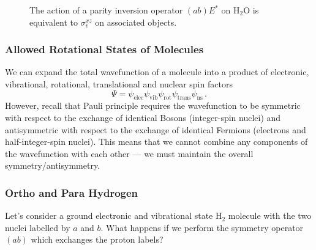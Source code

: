 \documentclass{article}
\theoremstyle{plain}\theoremheaderfont{\normalfont\itshape}\theorembodyfont{\rmfamily}\theoremseparator{.}\newtheorem*{rem}{Remark}\newtheorem*{ex}{Example}\newtheorem*{proof}{Proof}\newtheorem*{altp}{Alternative proof}
\theoremstyle{plain}\theoremheaderfont{\normalfont\bfseries}\theorembodyfont{\rmfamily}\theoremseparator{.}\newtheorem{thm}{Theorem}[section]\newtheorem{lem}[thm]{Lemma}\newtheorem{prop}[thm]{Proposition}\newtheorem*{cor}{Corollary}\newtheorem{defn}[thm]{Definition}\newtheorem{clm}[thm]{Claim}\newtheorem{clminproof}{Claim}\newtheorem*{law}{Law}\newtheorem{pos}[thm]{Postulate}
\theoremstyle{break}\theoremheaderfont{\normalfont\itshape}\theorembodyfont{\rmfamily}\theoremseparator{.\medskip}\newtheorem*{proofskip}{Proof}\newtheorem*{exs}{Examples}\newtheorem*{rems}{Remarks}
\theoremstyle{break}\theoremheaderfont{\normalfont\bfseries}\theorembodyfont{\rmfamily}\theoremseparator{.\medskip}\newtheorem{lemskip}[thm]{Lemma}\newtheorem{defnskip}[thm]{Definition}\newtheorem{propskip}[thm]{Proposition}\newtheorem{thmskip}[thm]{Theorem}
\numberwithin{equation}{section}
\begin{document}
\begin{figure}[ht!]
        \caption{The action of a parity inversion operator \((ab)E^*\) on \(\mathrm{H_2O}\) is equivalent to \(\sigma_v^{xz}\) on associated objects.}
        \label{inversion_permutation}
    \end{figure}

    \subsubsection{Allowed Rotational States of Molecules}
    We can expand the total wavefunction of a molecule into a product of electronic, vibrational, rotational, translational and nuclear spin factors
    \begin{equation}
        \Psi=\psi_{\text{elec}}\psi_{\text{vib}}\psi_{\text{rot}}\psi_{\text{trans}}\psi_{\text{ns}}\,.
    \end{equation}
    However, recall that Pauli principle requires the wavefunction to be symmetric with respect to the exchange of identical Bosons (integer-spin nuclei) and antisymmetric with respect to the exchange of identical Fermions (electrons and half-integer-spin nuclei). This means that we cannot combine any components of the wavefunction with each other --- we must maintain the overall symmetry/antisymmetry.

    \subsubsection*{Ortho and Para Hydrogen}
    Let's consider a ground electronic and vibrational state \(\mathrm{H}_2\) molecule with the two nuclei labelled by \(a\) and \(b\). What happens if we perform the symmetry operator \((ab)\) which exchanges the proton labels?
\end{document}
